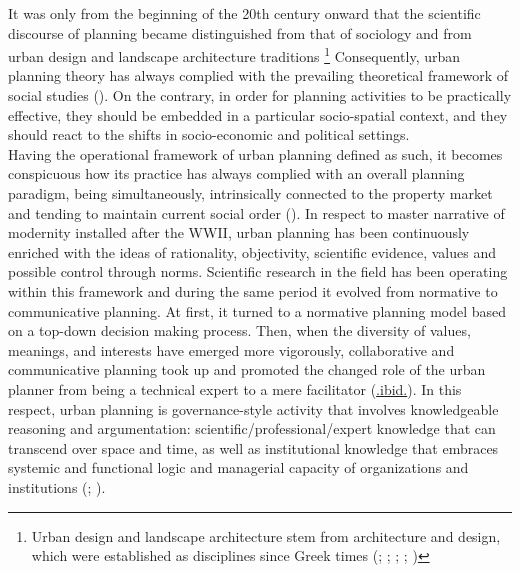 \documentclass[11pt]{report}
\begin{document}
It was only from the beginning of the 20th century onward that the scientific discourse of planning became distinguished from that of sociology and from urban design and landscape architecture traditions
\footnote{Urban design and landscape architecture stem from architecture and design, which were established as disciplines since Greek times
(\href{Handlin}{\citealt{Handlin and Burchard, 1966}};
\href{Allmedinger}{\citealt{Allmendinger, 2002}};
\href{Hall}{\citealt{Hall, 2002}};
\href{Platt}{\citealt{Platt, 2003}};
\href{Van}{\citealt{Van Assche et al. 2013}})} 
Consequently, urban planning theory has always complied with the prevailing theoretical framework of social studies (\href{Portugali}{\citealt{Portugali 2011}}).
On the contrary, in order for planning activities to be practically effective, they should be embedded in a particular socio-spatial context, and they should react to the shifts in socio-economic and political settings.
\\

Having the operational framework of urban planning defined as such, it becomes conspicuous how its practice has always complied with an overall planning paradigm, being simultaneously, intrinsically  connected to the property  market and tending to maintain current social order (\href{Taylor}{\citealt{Taylor_Urban_2006}}). 
In respect to master narrative of modernity installed after the WWII, urban planning has been continuously enriched with the ideas of rationality, objectivity, scientific evidence, values and possible control through norms. 
Scientific  research  in  the  field has been operating  within  this  framework  and  during  the  same  period it evolved from normative to communicative planning.
At first, it turned to a  normative planning model based on a top-down decision making process.
Then, when the diversity of values, meanings, and interests have emerged more vigorously, collaborative and communicative planning took up and promoted the changed role of the urban planner from being a technical expert to a mere facilitator (\href{Taylor}{.ibid.}).
In this respect, urban planning is governance-style activity that involves knowledgeable reasoning and argumentation: scientific/professional/expert knowledge that can transcend over space and time, as well as institutional knowledge that embraces systemic and functional logic and managerial capacity of organizations and institutions (\href{Healey}{\citealt{Healey_Collaborative_1997}}; \href{Getimis}{\citealt{Getimis 2012}}).
\\ 
\end{document}
